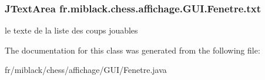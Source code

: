 \subsubsection[{txt}]{\setlength{\rightskip}{0pt plus 5cm}J\-Text\-Area fr.\-miblack.\-chess.\-affichage.\-G\-U\-I.\-Fenetre.\-txt\hspace{0.3cm}{\ttfamily [static]}}\label{classfr_1_1miblack_1_1chess_1_1affichage_1_1GUI_1_1Fenetre_acaf405fbc0ff8294083e70f115aab4ea}
le texte de la liste des coups jouables 

The documentation for this class was generated from the following file\-:\begin{DoxyCompactItemize}
\item 
fr/miblack/chess/affichage/\-G\-U\-I/Fenetre.\-java\end{DoxyCompactItemize}
